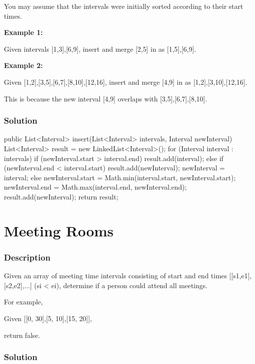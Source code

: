 You may assume that the intervals were initially sorted according to their start times.

\textbf{Example 1:}

Given intervals [1,3],[6,9], insert and merge [2,5] in as [1,5],[6,9].

\textbf{Example 2:}

Given [1,2],[3,5],[6,7],[8,10],[12,16], insert and merge [4,9] in as [1,2],[3,10],[12,16].

This is because the new interval [4,9] overlaps with [3,5],[6,7],[8,10].

\subsubsection{Solution}

\begin{Code}
public List<Interval> insert(List<Interval> intervals, Interval newInterval) {
    List<Interval> result = new LinkedList<Interval>();
    for (Interval interval : intervals) {
        if (newInterval.start > interval.end) {
            result.add(interval);
        } else if (newInterval.end < interval.start) {
            result.add(newInterval);
            newInterval = interval;
        } else {
            newInterval.start = Math.min(interval.start, newInterval.start);
            newInterval.end = Math.max(interval.end, newInterval.end);
        }
    }
    result.add(newInterval);
    return result;
}
\end{Code}

\newpage

\section{Meeting Rooms} %

\subsubsection{Description}
Given an array of meeting time intervals consisting of start and end times [[s1,e1],[s2,e2],...] (si < ei), determine if a person could attend all meetings.

For example,

Given [[0, 30],[5, 10],[15, 20]],

return false.

\subsubsection{Solution}

